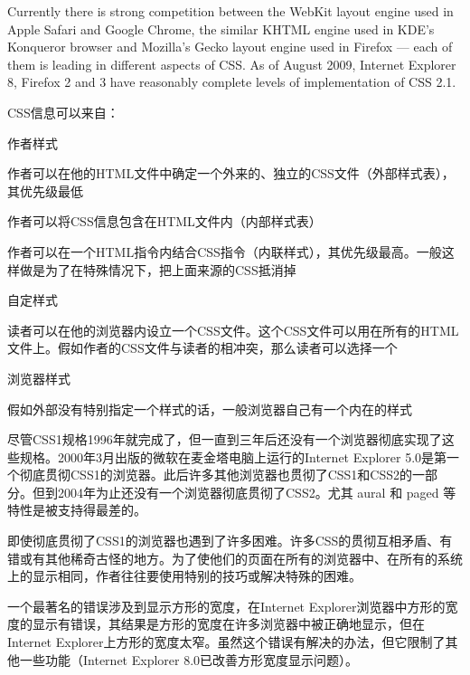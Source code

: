 Currently there is strong competition between the WebKit layout engine used in Apple Safari and Google Chrome, the similar KHTML engine used in KDE's Konqueror browser and Mozilla's Gecko layout engine used in Firefox — each of them is leading in different aspects of CSS. As of August 2009, Internet Explorer 8, Firefox 2 and 3 have reasonably complete levels of implementation of CSS 2.1.

CSS信息可以来自：

\begin{compactitem}
\item 作者样式
	\begin{compactitem}
	\item 作者可以在他的HTML文件中确定一个外来的、独立的CSS文件（外部样式表），其优先级最低
	\item 作者可以将CSS信息包含在HTML文件内（内部样式表）
	\item 作者可以在一个HTML指令内结合CSS指令（内联样式），其优先级最高。一般这样做是为了在特殊情况下，把上面来源的CSS抵消掉
	\end{compactitem}	
\item 自定样式
	\begin{compactitem}
	\item 读者可以在他的浏览器内设立一个CSS文件。这个CSS文件可以用在所有的HTML文件上。假如作者的CSS文件与读者的相冲突，那么读者可以选择一个
	\end{compactitem}
\item 浏览器样式
	\begin{compactitem}
	\item 假如外部没有特别指定一个样式的话，一般浏览器自己有一个内在的样式
	\end{compactitem}
\end{compactitem}


尽管CSS1规格1996年就完成了，但一直到三年后还没有一个浏览器彻底实现了这些规格。2000年3月出版的微软在麦金塔电脑上运行的Internet Explorer 5.0是第一个彻底贯彻CSS1的浏览器。此后许多其他浏览器也贯彻了CSS1和CSS2的一部分。但到2004年为止还没有一个浏览器彻底贯彻了CSS2。尤其 aural 和 paged 等特性是被支持得最差的。

即使彻底贯彻了CSS1的浏览器也遇到了许多困难。许多CSS的贯彻互相矛盾、有错或有其他稀奇古怪的地方。为了使他们的页面在所有的浏览器中、在所有的系统上的显示相同，作者往往要使用特别的技巧或解决特殊的困难。

一个最著名的错误涉及到显示方形的宽度，在Internet Explorer浏览器中方形的宽度的显示有错误，其结果是方形的宽度在许多浏览器中被正确地显示，但在Internet Explorer上方形的宽度太窄。虽然这个错误有解决的办法，但它限制了其他一些功能（Internet Explorer 8.0已改善方形宽度显示问题）。


